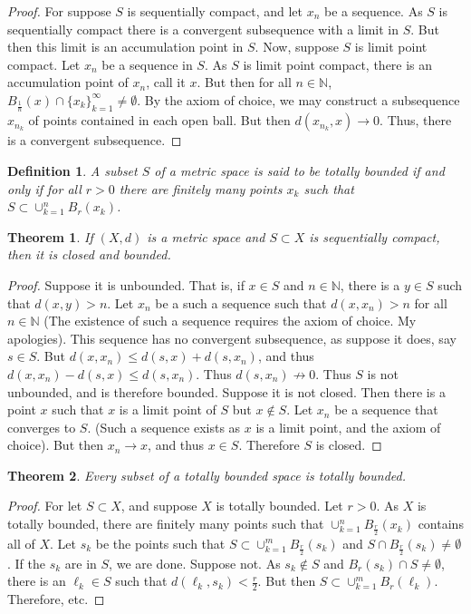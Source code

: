 \documentclass[crop=false,class=book]{standalone}
\theoremstyle{mystyle}
\newtheorem{theorem}{Theorem}[section]
\newtheorem{definition}{Definition}[section]
\begin{document}
\begin{proof}
For suppose $S$ is sequentially compact, and let $x_n$ be a sequence. As $S$ is sequentially compact there is a convergent subsequence with a limit in $S$. But then this limit is an accumulation point in $S$. Now, suppose $S$ is limit point compact. Let $x_n$ be a sequence in $S$. As $S$ is limit point compact, there is an accumulation point of $x_n$, call it $x$. But then for all $n\in \mathbb{N}$, $B_{\frac{1}{n}}(x)\cap \{x_k\}_{k=1}^{\infty}\ne \emptyset$. By the axiom of choice, we may construct a subsequence $x_{n_k}$ of points contained in each open ball. But then $d(x_{n_k},x)\rightarrow 0$. Thus, there is a convergent subsequence.
\end{proof}
\begin{definition}
A subset $S$ of a metric space is said to be totally bounded if and only if for all $r>0$ there are finitely many points $x_k$ such that $S\subset \cup_{k=1}^{n} B_{r}(x_k)$.
\end{definition}
\begin{theorem}
If $(X,d)$ is a metric space and $S\subset X$ is sequentially compact, then it is closed and bounded.
\end{theorem}
\begin{proof}
\item Suppose it is unbounded. That is, if $x\in S$ and $n\in \mathbb{N}$, there is a $y\in S$ such that $d(x,y)>n$. Let $x_n$ be a such a sequence such that $d(x,x_n)>n$ for all $n\in \mathbb{N}$ (The existence of such a sequence requires the axiom of choice. My apologies). This sequence has no convergent subsequence, as suppose it does, say $s\in S$. But $d(x,x_n) \leq d(s,x)+d(s,x_n)$, and thus $d(x,x_n)-d(s,x)\leq d(s,x_n)$. Thus $d(s,x_n) \not\rightarrow 0$. Thus $S$ is not unbounded, and is therefore bounded. Suppose it is not closed. Then there is a point $x$ such that $x$ is a limit point of $S$ but $x\notin S$. Let $x_n$ be a sequence that converges to $S$. (Such a sequence exists as $x$ is a limit point, and the axiom of choice). But then $x_n \rightarrow x$, and thus $x\in S$. Therefore $S$ is closed.
\end{proof}
\begin{theorem}
Every subset of a totally bounded space is totally bounded.
\end{theorem}
\begin{proof}
For let $S\subset X$, and suppose $X$ is totally bounded. Let $r>0$. As $X$ is totally bounded, there are finitely many points such that $\cup_{k=1}^{n} B_{\frac{r}{2}}(x_k)$ contains all of $X$. Let $s_k$ be the points such that $S\subset \cup_{k=1}^{m} B_{\frac{r}{2}}(s_k)$ and $S\cap B_{\frac{r}{2}}(s_k) \ne \emptyset$. If the $s_k$ are in $S$, we are done. Suppose not. As $s_k \notin S$ and $B_{r}(s_k)\cap S \ne \emptyset$, there is an $\ell_k \in S$ such that $d(\ell_k,s_k)< \frac{r}{2}$. But then $S\subset \cup_{k=1}^{m} B_{r}(\ell_k)$. Therefore, etc.
\end{proof}
\end{document}
